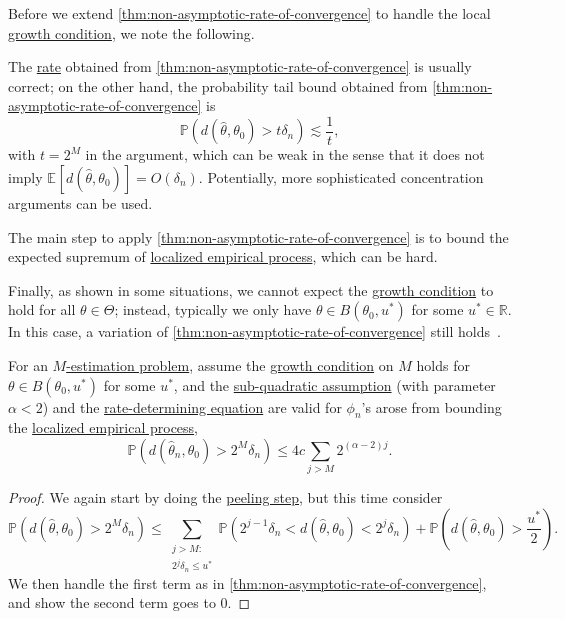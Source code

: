 Before we extend \autoref{thm:non-asymptotic-rate-of-convergence} to handle the local \hyperref[def:growth-condition*]{growth condition}, we note the following.

\begin{remark}
	The \hyperref[def:rate-of-convergence]{rate} obtained from \autoref{thm:non-asymptotic-rate-of-convergence} is usually correct; on the other hand, the probability tail bound obtained from \autoref{thm:non-asymptotic-rate-of-convergence} is
	\[
		\mathbb{P} (d(\hat{\theta} , \theta _0) > t \delta _n) \lesssim \frac{1}{t},
	\]
	with \(t = 2^M\) in the argument, which can be weak in the sense that it does not imply \(\mathbb{E}_{}[d(\hat{\theta} , \theta _0) ] = O(\delta _n)\). Potentially, more sophisticated concentration arguments can be used.
\end{remark}

\begin{remark}
	The main step to apply \autoref{thm:non-asymptotic-rate-of-convergence} is to bound the expected supremum of \hyperref[def:localized-EP]{localized empirical process}, which can be hard.
\end{remark}

Finally, as shown in some situations, we cannot expect the \hyperref[def:growth-condition*]{growth condition} to hold for all \(\theta \in \Theta \); instead, typically we only have \(\theta \in B(\theta _0, u^{\ast} )\) for some \(u^{\ast} \in \mathbb{R} \). In this case, a variation of \autoref{thm:non-asymptotic-rate-of-convergence} still holds~\cite[Theorem 3.2.5]{vandervaartWeakConvergenceEmpirical1996}.

\begin{theorem}\label{thm:non-asymptotic-rate-of-convergence-extend}
	For an \hyperref[prb:M-estimation]{\(M\)-estimation problem}, assume the \hyperref[def:growth-condition*]{growth condition} on \(M\) holds for \(\theta \in B(\theta _0, u^{\ast} )\) for some \(u^{\ast} \), and the \hyperref[def:sub-quadratic-assumption]{sub-quadratic assumption} (with parameter \(\alpha < 2\)) and the \hyperref[def:rate-determining-equation]{rate-determining equation} are valid for \(\phi _n\)'s arose from bounding the \hyperref[def:localized-EP]{localized empirical process},
	\[
		\mathbb{P} (d(\hat{\theta} _n, \theta _0) > 2^M \delta _n) \leq 4c \sum_{j > M} 2^{(\alpha -2) j}.
	\]
\end{theorem}
\begin{proof}
	We again start by doing the \hyperref[eq:peeling-step]{peeling step}, but this time consider
	\[
		\mathbb{P} (d(\hat{\theta} , \theta _0) > 2^M \delta _n)
		\leq \sum_{\substack{j > M\colon \\ 2^j \delta _n \leq u^{\ast} }} \mathbb{P} (2^{j-1} \delta _n < d(\hat{\theta} , \theta _0) < 2^j \delta _n) + \mathbb{P} \left( d(\hat{\theta} , \theta _0) > \frac{u^{\ast} }{2} \right).
	\]
	We then handle the first term as in \autoref{thm:non-asymptotic-rate-of-convergence}, and show the second term goes to \(0\).
\end{proof}

